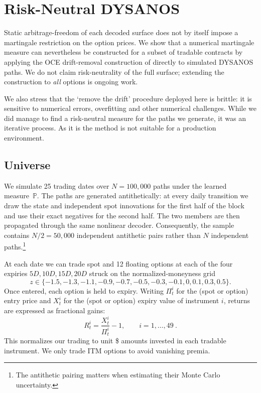 \documentclass[11pt,a4paper]{article}
\renewcommand{\P}{\mathbb{P}}
\begin{document}
\section{Risk-Neutral DYSANOS}
\label{sec:risk-neutral}

Static arbitrage-freedom of each decoded surface does not by itself impose a
martingale restriction on the option prices. We show that a numerical martingale
measure can nevertheless be constructed for a subset of tradable contracts by
applying the OCE drift-removal construction of
\citet{removedrift} directly to simulated DYSANOS paths.  We do not
claim risk-neutrality of the full surface; extending the construction to
\emph{all} options is ongoing work.

We also stress that the `remove the drift' procedure deployed here is brittle: it is sensitive to numerical
errors, overfitting and other numerical challenges. While we did manage to find a risk-neutral
measure for the paths we generate, it was an iterative process. As it is the method is not suitable
for a production environment.

\subsection{Universe}
\label{sec:risk-neutral-universe}

We simulate 25 trading dates over
$N=100{,}000$ paths under the learned measure~$\P$.
The paths are generated antithetically: at every daily
transition we draw the state and independent spot innovations for the first
half of the block and use their exact negatives for the second half.  The two
members are then propagated through the same nonlinear decoder.
Consequently, the sample contains $N/2=50{,}000$
independent antithetic pairs rather than $N$ independent paths.\footnote{The antithetic pairing matters when estimating
their Monte Carlo uncertainty.}

At each date we can trade spot and 12 floating options
at each of the
four expiries $5D,10D,15D,20D$ struck on the  normalized-moneyness
grid
\[
z\in\{-1.5,-1.3,-1.1,-0.9,-0.7,-0.5,-0.3,-0.1,0,0.1,0.3,0.5\}.
\]
Once entered, each option is held to expiry.
Writing $\Pi_t^i$ for the (spot or option) entry price and $X_t^i$ for the (spot or option) expiry value of instrument
$i$, returns are expressed as fractional gains:
\begin{equation}
  R_t^i=\frac{X_t^i}{\Pi_t^i}-1,
  \qquad i=1,\ldots,49 \ .
  \label{eq:rn-returns}
\end{equation}
This normalizes our trading to unit \$ amounts invested in each tradable instrument. We only trade ITM options to avoid vanishing premia.
\end{document}
